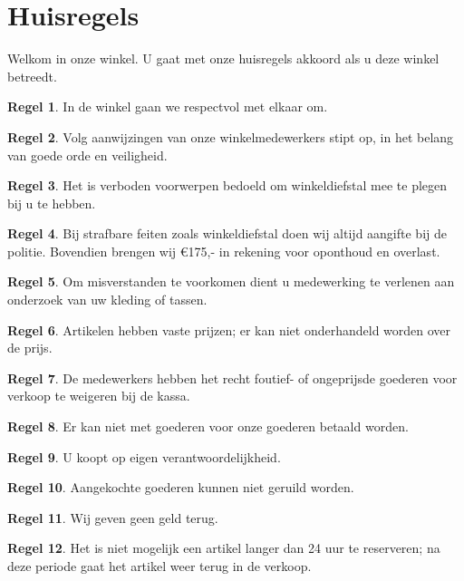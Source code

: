 \documentclass[12pt,a4paper]{article}
\theoremstyle{definition}
\newtheorem{regel}{Regel}
\begin{document}
\thispagestyle{empty}
\section*{Huisregels}
Welkom in onze winkel. 
U gaat met onze huisregels akkoord als u deze winkel betreedt.

\begin{regel}
In de winkel gaan we respectvol met elkaar om.
\end{regel}
\begin{regel}
Volg aanwijzingen van onze winkelmedewerkers stipt op, in het belang van goede orde en veiligheid.
\end{regel}
\begin{regel}
Het is verboden voorwerpen bedoeld om winkeldiefstal mee te plegen bij u te hebben.
\end{regel}
\begin{regel}
Bij strafbare feiten zoals winkeldiefstal doen wij altijd aangifte bij de politie. Bovendien brengen wij \euro 175,- in rekening voor oponthoud en overlast. 
\end{regel}
\begin{regel}
Om misverstanden te voorkomen dient u medewerking te verlenen aan onderzoek van uw kleding of tassen.
\end{regel}
\begin{regel}

Artikelen hebben vaste prijzen; er kan niet onderhandeld worden over de prijs.
\end{regel}
\begin{regel}
De medewerkers hebben het recht foutief- of ongeprijsde goederen voor verkoop te weigeren bij de kassa.
\end{regel}
\begin{regel}
Er kan niet met goederen voor onze goederen betaald worden.
\end{regel}
\begin{regel}
U koopt op eigen verantwoordelijkheid.
\end{regel}
\begin{regel}
Aangekochte goederen kunnen niet geruild worden.
\end{regel}
\begin{regel}
Wij geven geen geld terug.
\end{regel}
\begin{regel}
Het is niet mogelijk een artikel langer dan 24 uur te reserveren; na deze periode gaat het artikel weer terug in de verkoop.
\end{regel}
\end{document}
